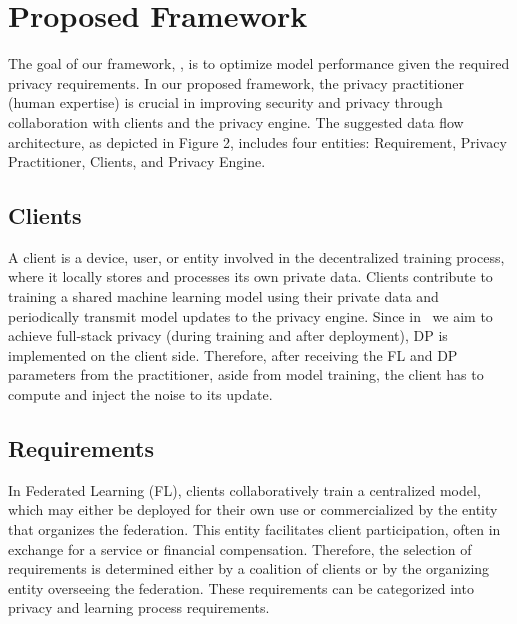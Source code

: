 \section{Proposed Framework}
The goal of our framework, \oursys, is to optimize model performance given the required privacy requirements. 
In our proposed framework, the privacy practitioner (human expertise) is crucial in improving security and privacy through collaboration with clients and the privacy engine. The suggested data flow architecture, as depicted in Figure 2, includes four entities: Requirement, Privacy Practitioner, Clients, and Privacy Engine.




\subsection{Clients}
A client is a device, user, or entity involved in the decentralized training process, where it locally stores and processes its own private data. Clients contribute to training a shared machine learning model using their private data and periodically transmit model updates to the privacy engine. Since in \oursys~we aim to achieve full-stack privacy (during training and after deployment),  DP is implemented on the client side. 
%
Therefore, after receiving the FL and DP parameters from the practitioner, aside from model training, the client has to compute and inject the noise to its update. 
\subsection{Requirements}
In Federated Learning (FL), clients collaboratively train a centralized model, which may either be deployed for their own use or commercialized by the entity that organizes the federation. 
This entity facilitates client participation, often in exchange for a service or financial compensation.
Therefore, the selection of requirements is determined either by a coalition of clients or by the organizing entity overseeing the federation.
These requirements can be categorized into privacy and learning process requirements.
